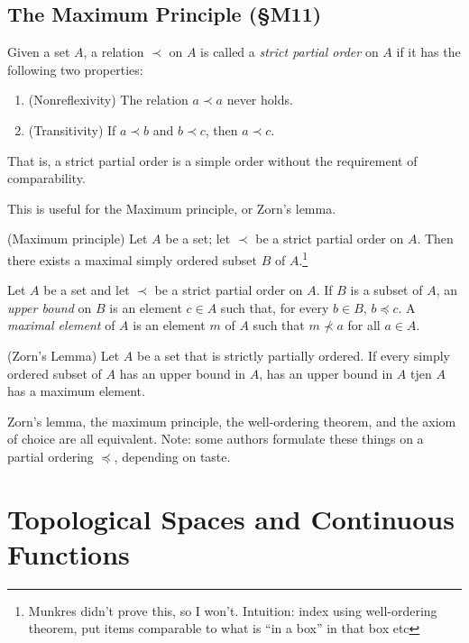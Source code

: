 \documentclass{report}
\begin{document}
\section{The Maximum Principle (\S M11)}
\begin{definition}
  Given a set $A$, a relation $\prec$ on $A$ is called a \emph{strict partial order} on $A$ if it has the following two properties:
  \begin{enumerate}[label={(\arabic*)}]
    \item (Nonreflexivity) The relation $a \prec a$ never holds.
    \item (Transitivity) If $a \prec b$ and $b \prec c$, then $a \prec c$.
  \end{enumerate}
  That is, a strict partial order is a simple order without the requirement of comparability.
\end{definition}

This is useful for the Maximum principle, or Zorn's lemma.
\begin{theorem}
  {\normalfont (Maximum principle)}
  Let $A$ be a set; let  $\prec$ be a strict partial order on $A$.
  Then there exists a maximal simply ordered subset $B$ of $A$.\footnote{Munkres didn't prove this, so I won't. Intuition: index using well-ordering theorem, put items comparable to what is ``in a box'' in that box etc}
\end{theorem}

\begin{definition}
  Let $A$ be a set and let $\prec$ be a strict partial order on $A$.
  If $B$ is a subset of $A$, an \emph{upper bound} on $B$ is an element $c \in A$ such that, for every $b \in B$, $b \preceq c$.
  A \emph{maximal element} of $A$ is an element $m$ of $A$ such that $m \not\prec a$ for all $a \in A$.
\end{definition}

\begin{lemma}
  {\normalfont (Zorn's Lemma)}
  Let $A$ be a set that is strictly partially ordered. 
  If every simply ordered subset of $A$ has an upper bound in $A$, has an upper bound in $A$ tjen $A$ has a maximum element.
\end{lemma}

Zorn's lemma, the maximum principle, the well-ordering theorem, and the axiom of choice are all equivalent.
Note: some authors formulate these things on a partial ordering $\preceq$, depending on taste.

\chapter{Topological Spaces and Continuous Functions}
\end{document}
